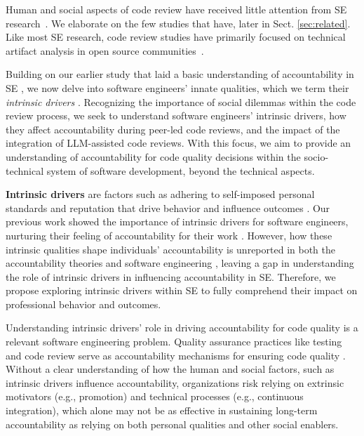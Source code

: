 Human and social aspects of code review have received little attention from SE research~\citep{davila2021systematic,badampudi2023modern}. We elaborate on the few studies that have, later in Sect. \ref{sec:related}. Like most SE research, code review studies have primarily focused on technical artifact analysis in open source communities~\citep{Storey2020}. 

Building on our earlier study that laid a basic understanding of accountability in SE \citep{alami2024understanding}, we now delve into software engineers' innate qualities, which we term their \emph{intrinsic drivers} \cite{deci2000and}. Recognizing the importance of social dilemmas within the code review process, we seek to understand software engineers' intrinsic drivers, how they affect accountability during peer-led code reviews, and the impact of the integration of LLM-assisted code reviews. With this focus, we aim to provide an understanding of accountability for code quality decisions within the socio-technical system of software development, beyond the technical aspects. 

\textbf{Intrinsic drivers} are factors such as adhering to self-imposed personal standards and reputation that drive behavior and influence outcomes \citep{cameron1994reinforcement,fishbach2022structure}. Our previous work showed the importance of intrinsic drivers for software engineers, nurturing their feeling of accountability for their work \citep{alami2024understanding}. However, how these intrinsic qualities shape individuals' accountability is unreported in both the accountability theories \citep{frink1998toward,frink2004advancing} and software engineering \citep{alami2024understanding}, leaving a gap in understanding the role of intrinsic drivers in influencing accountability in SE. Therefore, we propose exploring intrinsic drivers within SE to fully comprehend their impact on professional behavior and outcomes.

Understanding intrinsic drivers' role in driving accountability for code quality is a relevant software engineering problem. Quality assurance practices like testing and code review serve as accountability mechanisms for ensuring code quality \citep{alami2024understanding,bosu2013impact}. Without a clear understanding of how the human and social factors, such as intrinsic drivers influence accountability, organizations risk relying on extrinsic motivators (e.g., promotion) and technical processes (e.g., continuous integration), which alone may not be as effective in sustaining long-term accountability as relying on both personal qualities and other social enablers.

